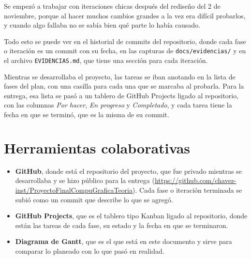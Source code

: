 \documentclass[11pt,a4paper]{article}
\begin{document}
Se empezó a trabajar con iteraciones chicas después del rediseño del 2 de noviembre, porque al hacer muchos cambios grandes a la vez era difícil probarlos, y cuando algo fallaba no se sabía bien qué parte lo había causado.

Todo esto se puede ver en el historial de commits del repositorio, donde cada fase o iteración es un commit con su fecha, en las capturas de \texttt{docs/evidencias/} y en el archivo \texttt{EVIDENCIAS.md}, que tiene una sección para cada iteración.


Mientras se desarrollaba el proyecto, las tareas se iban anotando en la lista de fases del plan, con una casilla para cada una que se marcaba al probarla. Para la entrega, esa lista se pasó a un tablero de GitHub Projects ligado al repositorio, con las columnas \textit{Por hacer}, \textit{En progreso} y \textit{Completado}, y cada tarea tiene la fecha en que se terminó, que es la misma de su commit.


\section{Herramientas colaborativas}

\begin{itemize}
  \item \textbf{GitHub}, donde está el repositorio del proyecto, que fue privado mientras se desarrollaba y se hizo público para la entrega (\url{https://github.com/chavez-inst/ProyectoFinalCompuGraficaTeoria}). Cada fase o iteración terminada se subió como un commit que describe lo que se agregó.
  \item \textbf{GitHub Projects}, que es el tablero tipo Kanban ligado al repositorio, donde están las tareas de cada fase, su estado y la fecha en que se terminaron.
  \item \textbf{Diagrama de Gantt}, que es el que está en este documento y sirve para comparar lo planeado con lo que pasó en realidad.
\end{itemize}
\end{document}
